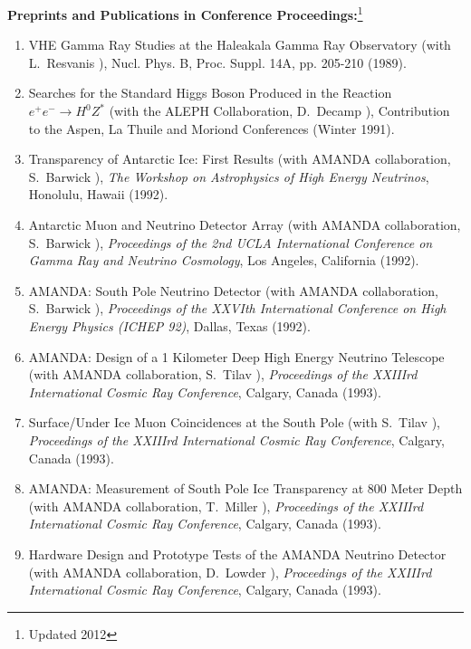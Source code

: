 {\bf Preprints and Publications in Conference  Proceedings:}\footnote{Updated 2012}
\vspace{0.25cm}

\begin{enumerate}
\item VHE Gamma Ray Studies at the Haleakala Gamma Ray Observatory
  (with L.~Resvanis \etal), Nucl. Phys. B, Proc. Suppl. 14A,
  pp. 205-210 (1989).

\item Searches for the Standard Higgs Boson Produced in the Reaction
  ${e^+}{e^-} \rightarrow H^0 Z^*$ (with the ALEPH Collaboration,
  D.~Decamp \etal), Contribution to the Aspen, La Thuile and Moriond
  Conferences (Winter 1991).

\item Transparency of Antarctic Ice: First Results (with AMANDA
  collaboration, S.~Barwick \etal), {\it The Workshop on Astrophysics
    of High Energy Neutrinos}, Honolulu, Hawaii (1992).

\item Antarctic Muon and Neutrino Detector Array (with AMANDA
  collaboration, S.~Barwick \etal), {\it Proceedings of the 2nd UCLA
    International Conference on Gamma Ray and Neutrino Cosmology}, Los
  Angeles, California (1992).

\item AMANDA: South Pole Neutrino Detector (with AMANDA collaboration,
  S.~Barwick \etal), {\it Proceedings of the XXVIth International
    Conference on High Energy Physics (ICHEP 92)}, Dallas, Texas
  (1992).

\item AMANDA: Design of a 1 Kilometer Deep High Energy Neutrino
  Telescope (with AMANDA collaboration, S.~Tilav \etal), {\it
    Proceedings of the XXIIIrd International Cosmic Ray Conference},
  Calgary, Canada (1993).

\item Surface/Under Ice Muon Coincidences at the South Pole (with
  S.~Tilav \etal), {\it Proceedings of the XXIIIrd International
    Cosmic Ray Conference}, Calgary, Canada (1993).

\item AMANDA: Measurement of South Pole Ice Transparency at 800 Meter
  Depth (with AMANDA collaboration, T.~Miller \etal), {\it Proceedings
    of the XXIIIrd International Cosmic Ray Conference}, Calgary,
  Canada (1993).

\item Hardware Design and Prototype Tests of the AMANDA Neutrino
  Detector (with AMANDA collaboration, D.~Lowder \etal), {\it
    Proceedings of the XXIIIrd International Cosmic Ray Conference},
  Calgary, Canada (1993).


\end{enumerate}
